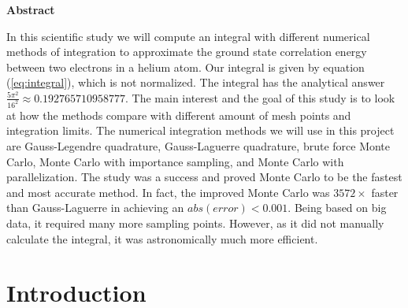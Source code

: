\documentclass{article}
\begin{document}
\vspace{1cm}


\begin{center}

{\Large\textbf{Abstract}} \label{sec:Abstract}

\end{center}

\vspace{5mm}

In this scientific study we will compute an integral with different numerical methods of integration to approximate the ground state correlation energy between two electrons in a helium atom. Our integral is given by equation (\ref{eq:integral}), which is not normalized. The integral has the analytical answer $\frac{5 \pi^2}{16^2} \approx 0.192765710958777$. The main interest and the goal of this study is to look at how the methods compare with different amount of mesh points and integration limits. The numerical integration methods we will use in this project are Gauss-Legendre quadrature, Gauss-Laguerre quadrature, brute force Monte Carlo, Monte Carlo with importance sampling, and Monte Carlo with parallelization. The study was a success and proved Monte Carlo to be the fastest and most accurate method. In fact, the improved Monte Carlo was $3572\times$ faster than Gauss-Laguerre in achieving an $abs( error)<0.001$. Being based on big data, it required many more sampling points. However, as it did not manually calculate the integral, it was astronomically much more efficient. \\



\newpage


\vspace{1cm}

\tableofcontents

\vspace{1cm}

\vspace{1cm}

\section{Introduction} \label{sec:Introduction}
\end{document}
